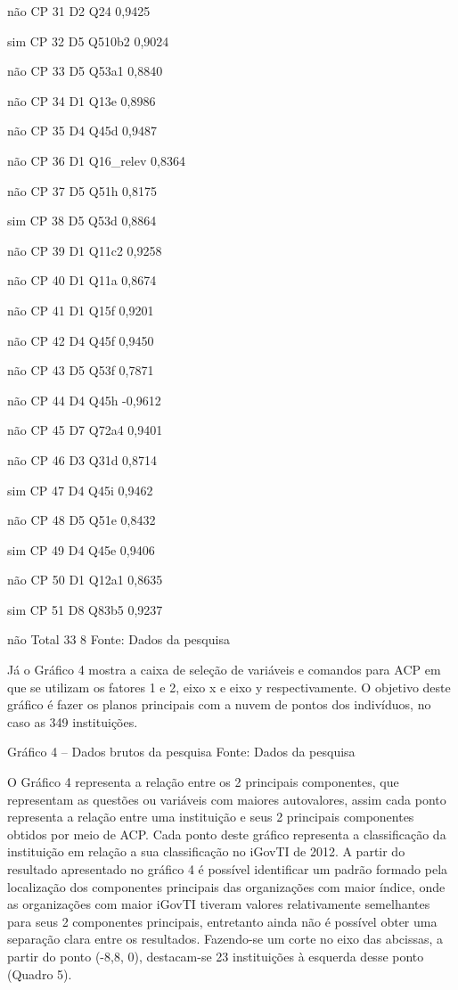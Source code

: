 não
CP 31
D2
 Q24
0,9425
 

sim
CP 32
D5
 Q510b2
0,9024
 

não
CP 33
D5
 Q53a1
0,8840
 

não
CP 34
D1
 Q13e
0,8986
 

não
CP 35
D4
 Q45d
0,9487
 

não
CP 36
D1
Q16_relev 
0,8364
 

não
CP 37
D5
 Q51h
0,8175
 

sim
CP 38
D5
 Q53d
0,8864
 

não
CP 39
D1
 Q11c2
0,9258
 

não
CP 40
D1
Q11a 
0,8674
 

não
CP 41
D1
 Q15f
0,9201
 

não
CP 42
D4
 Q45f
0,9450
 

não
CP 43
D5
 Q53f
0,7871
 

não
CP 44
D4
Q45h 
-0,9612
 

não
CP 45
D7
 Q72a4
0,9401
 

não
CP 46
D3
 Q31d
0,8714
 

sim
CP 47
D4
 Q45i
0,9462
 

não
CP 48
D5
 Q51e
0,8432
 

sim
CP 49
D4
 Q45e
0,9406
 

não
CP 50
D1
 Q12a1
0,8635
 

sim
CP 51
D8
 Q83b5
0,9237
 

não
Total
33
8
Fonte: Dados da pesquisa

Já o Gráfico 4 mostra a caixa de seleção de variáveis e comandos para ACP em que se utilizam os fatores 1 e 2, eixo x e eixo y respectivamente. O objetivo deste gráfico é fazer os planos principais com a nuvem de pontos dos indivíduos, no caso as 349 instituições.  


Gráfico 4 – Dados brutos da pesquisa
Fonte: Dados da pesquisa

O Gráfico 4 representa a relação entre os 2 principais componentes, que representam as questões ou variáveis com maiores autovalores, assim cada ponto representa a relação entre uma instituição e seus 2 principais componentes obtidos por meio de ACP. Cada ponto deste gráfico representa a classificação da instituição em relação a sua classificação no iGovTI de 2012. A partir do resultado apresentado no gráfico 4 é possível identificar um padrão formado pela localização dos componentes principais das organizações com maior índice, onde as organizações com maior iGovTI tiveram valores relativamente semelhantes para seus 2 componentes principais, entretanto ainda não é possível obter uma separação clara entre os resultados. Fazendo-se um corte no eixo das abcissas, a partir do ponto (-8,8, 0), destacam-se 23 instituições à esquerda desse ponto (Quadro 5). 

